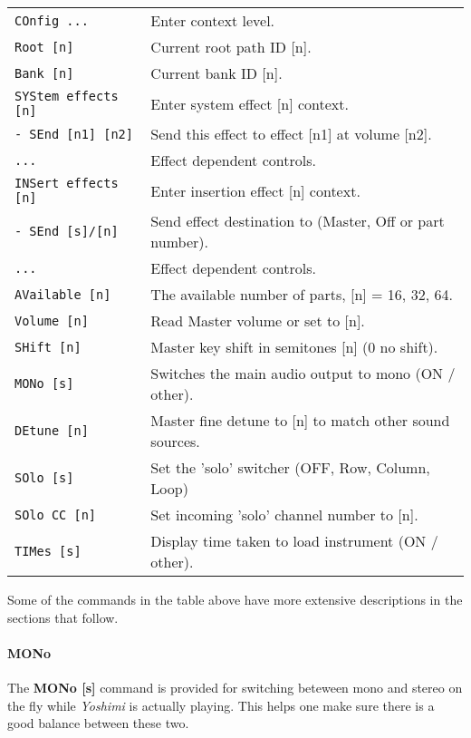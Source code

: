 \begin{center}
\begin{longtable}{p{6cm} p{10cm}}
\texttt{COnfig ...} &
   Enter context level. \\
\texttt{Root [n]} &
   Current root path ID [n]. \\
\texttt{Bank [n]} &
   Current bank ID [n]. \\
\texttt{SYStem effects [n]} &
   Enter system effect [n] context. \\
\texttt{- SEnd [n1] [n2]} &
   Send this effect to effect [n1] at volume [n2]. \\
\texttt{...} &
   Effect dependent controls. \\
\texttt{INSert effects [n]} &
   Enter insertion effect [n] context. \\
\texttt{- SEnd [s]/[n]} &
   Send effect destination to (Master, Off or part number). \\
\texttt{...} &
   Effect dependent controls. \\
\texttt{AVailable [n]} &
   The available number of parts, [n] = 16, 32, 64. \\
\texttt{Volume [n]} &
   Read Master volume or set to [n]. \\
\texttt{SHift [n]} &
   Master key shift in semitones [n] (0 no shift). \\
\texttt{MONo [s]} &
   Switches the main audio output to mono (ON / other). \\
\texttt{DEtune [n]} &
   Master fine detune to [n] to match other sound sources. \\
\texttt{SOlo [s]} &
   Set the 'solo' switcher (OFF, Row, Column, Loop) \\
\texttt{SOlo CC [n]} &
   Set incoming 'solo' channel number to [n]. \\
\texttt{TIMes [s]} &
   Display time taken to load instrument (ON / other). \\

\end{longtable}
\end{center}


   Some of the commands in the table above have more extensive descriptions in
   the sections that follow.

\paragraph{MONo}
\label{paragraph:command_line_mono}
    The \textbf{MONo [s]} command is provided for switching beteween mono and
    stereo on the fly while \textsl{Yoshimi} is actually playing. This helps
    one make sure there is a good balance between these two.


